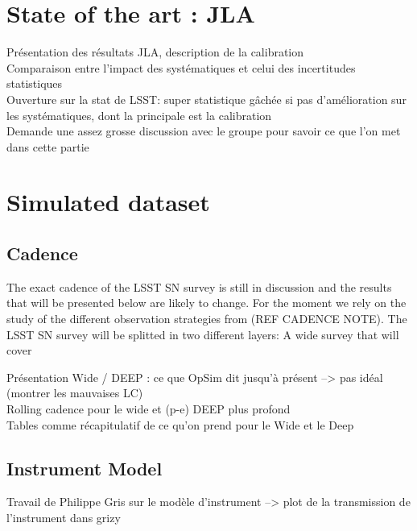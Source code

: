 \documentclass[\docopts]{\docclass}
\begin{document}

\section{State of the art : JLA}
\label{sec::jla}

Présentation des résultats JLA, description de la calibration \\
Comparaison entre l'impact des systématiques et celui des incertitudes statistiques \\
Ouverture sur la stat de LSST: super statistique gâchée si pas d'amélioration sur les systématiques, dont la principale est la calibration \\
Demande une assez grosse discussion avec le groupe pour savoir ce que l'on met dans cette partie


\section{Simulated dataset}
\label{sec::simulated_dataset}

\subsection{Cadence}
\label{subsec::cadence}

The exact cadence of the LSST SN survey is still in discussion and the results that will be presented below are likely to change.
For the moment we rely on the study of the different observation strategies from (REF CADENCE NOTE).
The LSST SN survey will be splitted in two different layers: A wide survey that will cover 

Présentation Wide / DEEP : ce que OpSim dit jusqu'à présent --> pas idéal (montrer les mauvaises LC)\\
Rolling cadence pour le wide et (p-e) DEEP plus profond\\
Tables comme récapitulatif de ce qu'on prend pour le Wide et le Deep\\

\subsection{Instrument Model}
Travail de Philippe Gris sur le modèle d'instrument --> plot de la transmission de l'instrument dans grizy
\end{document}
